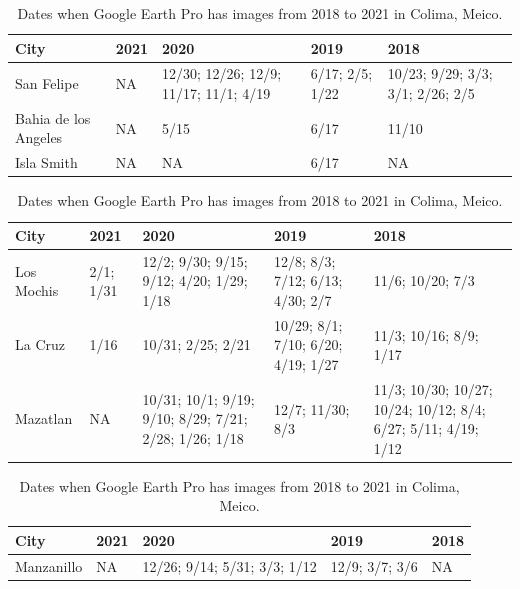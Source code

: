 \begin{table}[p]
\centering
\begin{tabular}{ p{3.5cm} | p{1cm} | p{3cm} | p{2cm} | p{3cm} }
\toprule
City & 2021 & 2020 & 2019 & 2018 \\
\midrule
San Felipe & NA & 12/30; 12/26; 12/9; 11/17; 11/1; 4/19 & 6/17; 2/5; 1/22 & 10/23; 9/29; 3/3; 3/1; 2/26; 2/5\\
\midrule
Bahia de los Angeles & NA & 5/15 & 6/17 & 11/10\\
\midrule
Isla Smith & NA & NA & 6/17 & NA\\
\bottomrule
\end{tabular}
\caption{Dates when Google Earth Pro has images from 2018 to 2021 in Baja California, Meico.}
\label{table:baja_california_dates}


\begin{tabular}{ p{3.5cm} | p{1cm} | p{3cm} | p{2cm} | p{3cm} }
\toprule
City & 2021 & 2020 & 2019 & 2018 \\
\midrule
Los Mochis & 2/1; 1/31 & 12/2; 9/30; 9/15; 9/12; 4/20; 1/29; 1/18 & 12/8; 8/3; 7/12; 6/13; 4/30; 2/7 & 11/6; 10/20; 7/3\\
\midrule
La Cruz & 1/16 & 10/31; 2/25; 2/21 & 10/29; 8/1; 7/10; 6/20; 4/19; 1/27 & 11/3; 10/16; 8/9; 1/17\\
\midrule
Mazatlan & NA & 10/31; 10/1; 9/19; 9/10; 8/29; 7/21; 2/28; 1/26; 1/18 & 12/7; 11/30; 8/3 & 11/3; 10/30; 10/27; 10/24; 10/12; 8/4; 6/27; 5/11; 4/19; 1/12\\
\bottomrule
\end{tabular}
\caption{Dates when Google Earth Pro has images from 2018 to 2021 in Sinaloa, Meico.}
\label{table:Sinaloa_dates}


\begin{tabular}{ p{3.5cm} | p{1cm} | p{3cm} | p{2cm} | p{3cm} }
\toprule
City & 2021 & 2020 & 2019 & 2018 \\
\midrule
Manzanillo & NA & 12/26; 9/14; 5/31; 3/3; 1/12 & 12/9; 3/7; 3/6 & NA\\
\bottomrule
\end{tabular}
\caption{Dates when Google Earth Pro has images from 2018 to 2021 in Colima, Meico.}
\label{table:Colima_dates}
\end{table}


